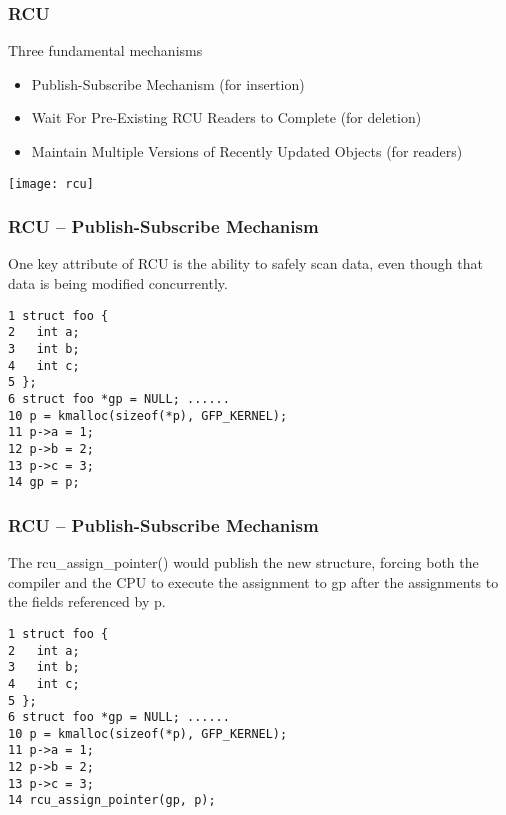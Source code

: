 \begin{frame}[fragile]
    \frametitle{RCU}
    \Large
    Three fundamental mechanisms
    \begin{itemize}
        \item  Publish-Subscribe Mechanism (for insertion) 
        \item  Wait For Pre-Existing RCU Readers to Complete (for deletion) 
        \item Maintain Multiple Versions of Recently Updated Objects (for readers) 
    \end{itemize}
    \centering
    \texttt{[image: rcu]}
    
    
%    
%    
%    
\end{frame}


\begin{frame}[fragile]
    \frametitle{RCU -- Publish-Subscribe Mechanism}
    \Large
    One key attribute of RCU is the ability to safely scan data, even though that data is being modified concurrently.
    
\small
    \begin{block}{}
    \begin{verbatim}
1 struct foo {
2   int a;
3   int b;
4   int c;
5 };
6 struct foo *gp = NULL; ......
10 p = kmalloc(sizeof(*p), GFP_KERNEL);
11 p->a = 1;
12 p->b = 2;
13 p->c = 3;
14 gp = p;
\end{verbatim}
\end{block}  
\end{frame}


\begin{frame}[fragile]
    \frametitle{RCU -- Publish-Subscribe Mechanism}
    \Large
The rcu\_assign\_pointer() would publish the new structure, forcing both the compiler and the CPU to execute the assignment to gp after the assignments to the fields referenced by p. 
    
    \small
    \begin{block}{}
        \begin{verbatim}
1 struct foo {
2   int a;
3   int b;
4   int c;
5 };
6 struct foo *gp = NULL; ......
10 p = kmalloc(sizeof(*p), GFP_KERNEL);
11 p->a = 1;
12 p->b = 2;
13 p->c = 3;
14 rcu_assign_pointer(gp, p);
        \end{verbatim}
    \end{block}  
\end{frame}

